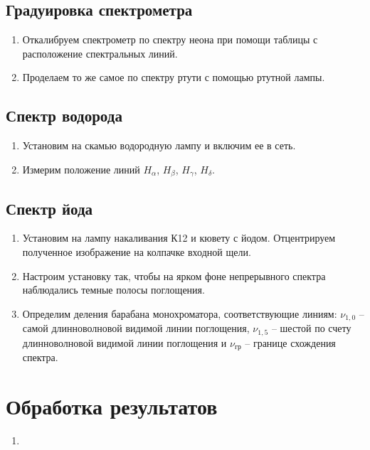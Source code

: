 \documentclass[14pt, a4paper]{report}
\begin{document}
\subsection{Градуировка спектрометра}

\begin{enumerate}

\setcounter{enumi}{0}

\item Откалибруем спектрометр по спектру неона при помощи таблицы с расположение спектральных линий.

\item Проделаем то же самое по спектру ртути с помощью ртутной лампы.

\end{enumerate}

\subsection{Спектр водорода}

\begin{enumerate}

\setcounter{enumi}{0}

\item Установим на скамью водородную лампу и включим ее в сеть.

\item Измерим положение линий $H_\alpha$, $H_\beta$, $H_\gamma$, $H_\delta$.

\end{enumerate}

\subsection{Спектр йода}

\begin{enumerate}

\setcounter{enumi}{0}

\item Установим на лампу накаливания К12 и кювету с йодом. Отцентрируем полученное изображение на колпачке входной щели.

\item Настроим установку так, чтобы на ярком фоне непрерывного спектра наблюдались темные полосы поглощения.

\item Определим деления барабана монохроматора, соответствующие линиям: $\nu_{1,0}$ -- самой длинноволновой видимой линии поглощения, $\nu_{1,5}$ -- шестой по счету длинноволновой видимой линии поглощения и $\nu_{гр}$ -- границе схождения спектра.

\end{enumerate}

\section{Обработка результатов}

\begin{enumerate}

\setcounter{enumi}{0}

\item 

\end{enumerate}
\end{document}

